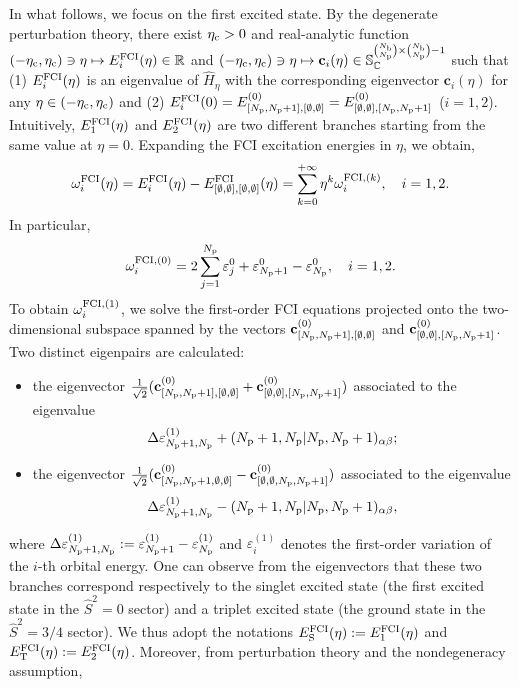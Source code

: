 \documentclass[11pt]{article}
\def\R{{\mathbb R}}
\def\C{{\mathbb C}}
\begin{document}
\par In what follows, we focus on the first excited state. By the degenerate perturbation theory, there exist $\eta_{\rm c}>0$ and real-analytic function $(-\eta_{\rm c},\eta_{\rm c})\owns\eta\mapsto E_i^{\rm FCI}(\eta)\in\R$ and $(-\eta_{\rm c},\eta_{\rm c})\owns\eta\mapsto\mathbf{c}_i(\eta)\in\mathbb{S}_{\C}^{\binom{N_{\rm b}}{N_{\rm p}}\times\binom{N_{\rm b}}{N_{\rm p}}-1}$ such that (1) $E^{\rm FCI}_i(\eta)$ is an eigenvalue of $\widehat{H}_\eta$ with the corresponding eigenvector $\mathbf{c}_i(\eta)$ for any $\eta\in(-\eta_{\rm c},\eta_{\rm c})$ and (2) $E^{\rm FCI}_i(0)=E_{[N_{\rm p},N_{\rm p}+1],[\emptyset,\emptyset]}^{(0)}=E_{[\emptyset,\emptyset],[N_{\rm p},N_{\rm p}+1]}^{(0)}$ ($i=1,2$). Intuitively, $E^{\rm FCI}_1(\eta)$ and $E^{\rm FCI}_2(\eta)$ are two different branches starting from the same value at $\eta=0$. Expanding the FCI excitation energies in $\eta$, we obtain,
$$\omega^{\rm FCI}_i(\eta)=E^{\rm FCI}_i(\eta)-E^{\rm FCI}_{[\emptyset,\emptyset],[\emptyset,\emptyset]}(\eta)=\sum_{k=0}^{+\infty}\eta^k\omega^{{\rm FCI},(k)}_i,\quad i=1,2.$$
In particular,
$$\omega_i^{{\rm FCI},(0)}=2\sum_{j=1}^{N_{\rm p}}\varepsilon_j^0+\varepsilon_{N_{\rm p}+1}^0-\varepsilon_{N_{\rm p}}^0,\quad i=1,2.$$
To obtain $\omega_i^{\rm FCI,(1)}$, we solve the first-order FCI equations projected onto the two-dimensional subspace spanned by the vectors $\mathbf{c}_{[N_{\rm p},N_{\rm p}+1],[\emptyset,\emptyset]}^{(0)}$ and $\mathbf{c}_{[\emptyset,\emptyset],[N_{\rm p},N_{\rm p}+1]}^{(0)}$. Two distinct eigenpairs are calculated: 
\begin{itemize}
    \item the eigenvector $\frac{1}{\sqrt2}(\mathbf{c}_{[N_{\rm p},N_{\rm p}+1],[\emptyset,\emptyset]}^{(0)}+\mathbf{c}_{[\emptyset,\emptyset],[N_{\rm p},N_{\rm p}+1]}^{(0)})$ associated to the eigenvalue 
    $$\Delta\varepsilon_{N_{\rm p}+1,N_{\rm p}}^{(1)} + (N_{\rm p}+1,N_{\rm p}|N_{\rm p},N_{\rm p}+1)_{\alpha\beta};$$
    
    \item the eigenvector $\frac{1}{\sqrt2}(\mathbf{c}_{[N_{\rm p},N_{\rm p}+1,\emptyset,\emptyset]}^{(0)}-\mathbf{c}_{[\emptyset,\emptyset,N_{\rm p},N_{\rm p}+1]}^{(0)})$ associated to the eigenvalue 
    $$\Delta\varepsilon_{N_{\rm p}+1,N_{\rm p}}^{(1)} - (N_{\rm p}+1,N_{\rm p}|N_{\rm p},N_{\rm p}+1)_{\alpha\beta},$$
\end{itemize}
where $\Delta\varepsilon_{N_{\rm p}+1,N_{\rm p}}^{(1)}:=\varepsilon_{N_{\rm p}+1}^{(1)}-\varepsilon_{N_{\rm p}}^{(1)}$ and $\varepsilon_i^{(1)}$ denotes the first-order variation of the $i$-th orbital energy. One can observe from the eigenvectors that these two branches correspond respectively to the singlet excited state (the first excited state in the $\hat{S}^2=0$ sector) and a triplet excited state (the ground state in the $\hat{S}^2=3/4$ sector). We thus adopt the notations $E_{\rm S}^{\rm FCI}(\eta):=E_1^{\rm FCI}(\eta)$ and $E_{\rm T}^{\rm FCI}(\eta):=E_2^{\rm FCI}(\eta)$. Moreover, from perturbation theory and the nondegeneracy assumption, 
\end{document}
